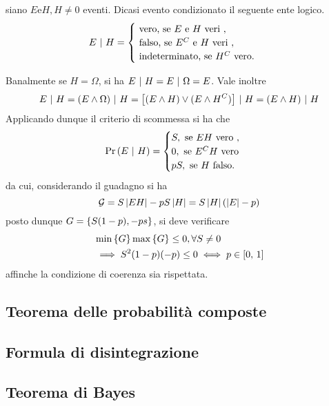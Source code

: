 \documentclass{subfiles}
\begin{document}
\begin{Definition*}
    siano \(E \text{e} H, H \neq 0\) eventi.
    Dicasi evento condizionato il seguente ente logico.
    \[E \Given H = \begin{cases}
            \text{vero, se} E \text{e} H \text{veri},      \\
            \text{falso, se} E^{C} \text{e} H \text{veri}, \\
            \text{indeterminato, se} H^{C} \text{vero.}
        \end{cases}\]
\end{Definition*}
Banalmente se \(H = \Omega\), si ha \(E \operatorname{\, | \,} H = E \operatorname{\, | \,} \Omega = E\).
Vale inoltre
\[
    E \operatorname{\, | \,} H = (E \land \Omega) \operatorname{\, | \,} H = \left[(E \land H) \lor (E \land H^{C})\right] \operatorname{\, | \,} H = (E \land H) \operatorname{\, | \,} H
\]
Applicando dunque il criterio di scommessa si ha che
\[
    \Prob{E}[H] = \begin{cases}
        S, \text{se} EH \text{vero},    \\
        0, \text{se} E^{C}H \text{vero} \\
        pS, \text{se} H \text{falso.}
    \end{cases}\]
da cui, considerando il guadagno si ha
\[
    \mathcal{G} = S \left\vert {EH} \right\vert - pS\left\vert {H} \right\vert = S\left\vert {H} \right\vert (\left\vert {E} \right\vert - p)
\]
posto dunque \(G = \Set{S(1 - p), -ps}\), si deve verificare
\[\begin{aligned}
         & \Min*{G}\Max*{G} \le 0, \forall S \neq 0                 \\
         & \implies S^{2}(1 - p)(-p) \le 0 \iff p \in \Range*{0}{1}
    \end{aligned}\]
affinche la condizione di coerenza sia rispettata.

\subsection{Teorema delle probabilità composte}

\subsection{Formula di disintegrazione}

\clearpage
\subsection{Teorema di Bayes}

\clearpage
\end{document}
